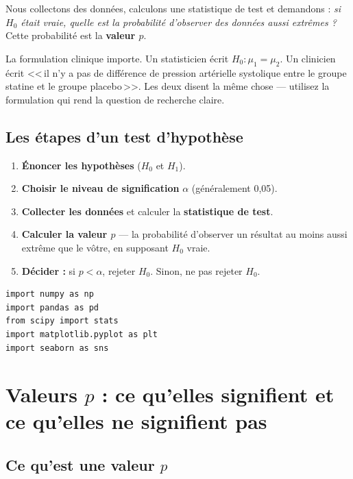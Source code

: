 Nous collectons des donn\'ees, calculons une statistique de test et demandons : \emph{si $H_0$ \'etait vraie, quelle est la probabilit\'e d'observer des donn\'ees aussi extr\^emes ?} Cette probabilit\'e est la \textbf{valeur $p$}.

\begin{clinicalnote}
La formulation clinique importe. Un statisticien \'ecrit $H_0: \mu_1 = \mu_2$. Un clinicien \'ecrit <<\,il n'y a pas de diff\'erence de pression art\'erielle systolique entre le groupe statine et le groupe placebo\,>>. Les deux disent la m\^eme chose --- utilisez la formulation qui rend la question de recherche claire.
\end{clinicalnote}

\subsection{Les \'etapes d'un test d'hypoth\`ese}

\begin{enumerate}
  \item \textbf{\'Enoncer les hypoth\`eses} ($H_0$ et $H_1$).
  \item \textbf{Choisir le niveau de signification} $\alpha$ (g\'en\'eralement 0,05).
  \item \textbf{Collecter les donn\'ees} et calculer la \textbf{statistique de test}.
  \item \textbf{Calculer la valeur $p$} --- la probabilit\'e d'observer un r\'esultat au moins aussi extr\^eme que le v\^otre, en supposant $H_0$ vraie.
  \item \textbf{D\'ecider :} si $p < \alpha$, rejeter $H_0$. Sinon, ne pas rejeter $H_0$.
\end{enumerate}

\begin{verbatim}
import numpy as np
import pandas as pd
from scipy import stats
import matplotlib.pyplot as plt
import seaborn as sns
\end{verbatim}

\section{Valeurs $p$ : ce qu'elles signifient et ce qu'elles ne signifient pas}

\subsection{Ce qu'est une valeur $p$}


